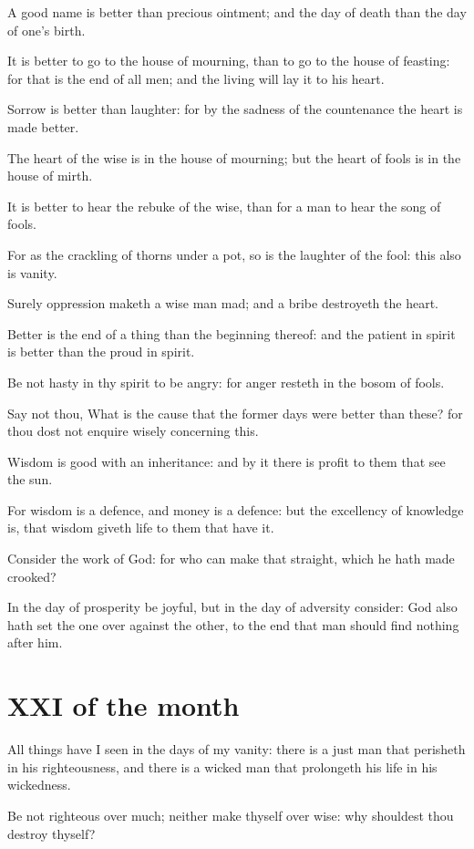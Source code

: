 A good name is better than precious ointment; and the day of death than the day of one's birth.

It is better to go to the house of mourning, than to go to the house of feasting: for that is the end of all men; and the living will lay it to his heart.

Sorrow is better than laughter: for by the sadness of the countenance the heart is made better.

The heart of the wise is in the house of mourning; but the heart of fools is in the house of mirth.

It is better to hear the rebuke of the wise, than for a man to hear the song of fools.

For as the crackling of thorns under a pot, so is the laughter of the fool: this also is vanity.

 Surely oppression maketh a wise man mad; and a bribe destroyeth the heart.

Better is the end of a thing than the beginning thereof: and the patient in spirit is better than the proud in spirit.

Be not hasty in thy spirit to be angry: for anger resteth in the bosom of fools.

Say not thou, What is the cause that the former days were better than these? for thou dost not enquire wisely concerning this.

Wisdom is good with an inheritance: and by it there is profit to them that see the sun.

For wisdom is a defence, and money is a defence: but the excellency of knowledge is, that wisdom giveth life to them that have it.

Consider the work of God: for who can make that straight, which he hath made crooked?

In the day of prosperity be joyful, but in the day of adversity consider: God also hath set the one over against the other, to the end that man should find nothing after him.

\section*{XXI of the month}

All things have I seen in the days of my vanity: there is a just man that perisheth in his righteousness, and there is a wicked man that prolongeth his life in his wickedness.

Be not righteous over much; neither make thyself over wise: why shouldest thou destroy thyself?

